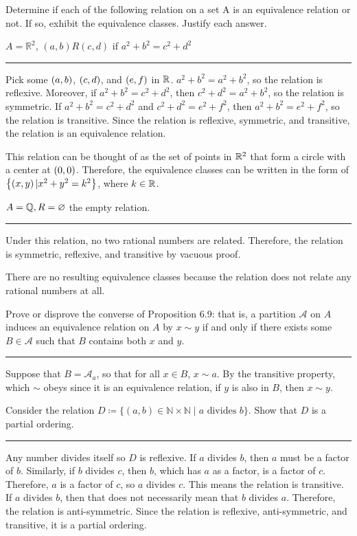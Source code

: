 \documentclass{article}
\begin{document}
\problem{}
Determine if each of the following relation on a set A is an equivalence relation or not.
If so, exhibit the equivalence classes.
Justify each answer.

\subproblema{}
$A=\mathbb{R}^2$, $(a,b) R(c,d)$ if $a^2+b^2=c^2+d^2$
\hrule

Pick some $\left (a, b \right)$, $\left (c, d \right)$, and $\left (e, f \right)$ in $\mathbb R$.
$a^2 + b^2 = a^2 + b^2$, so the relation is reflexive.
Moreover, if $a^2 + b^2 = c^2 + d^2$, then $c^2 + d^2 = a^2 + b^2$, so the relation is symmetric.
If $a^2 + b^2 = c^2 + d^2$ and $c^2 + d^2 = e^2 + f^2$, then $a^2 + b^2 = e^2 + f^2$, so the relation is transitive.
Since the relation is reflexive, symmetric, and transitive, the relation is an equivalence relation.

This relation can be thought of as the set of points in $\mathbb R^2$ that form a circle with a center at $\left (0, 0 \right)$.
Therefore, the equivalence classes can be written in the form of $\left \{  \left (x, y \right) | x^2 + y^2 = k^2 \right \}$, where $k \in \mathbb R$.

\subproblema{}

$A = \mathbb Q, R = \varnothing$ the empty relation.
\hrule

Under this relation, no two rational numbers are related.
Therefore, the relation is symmetric, reflexive, and transitive by vacuous proof.

There are no resulting equivalence classes because the relation does not relate any rational numbers at all.

\problem{}

Prove or disprove the converse of Proposition 6.9: that is, a partition $\mathcal{A}$ on $A$ induces an equivalence relation on $A$ by $x\sim y$ if and only if there exists some $B\in\mathcal{A}$ such that $B$ contains both $x$ and $y$.

\hrule
Suppose that $B = \mathcal{A}_a$, so that for all $x \in B$, $x \sim a$.
By the transitive property, which $\sim$ obeys since it is an equivalence relation, if $y$ is also in $B$, then $x \sim y$.


\problem{}
Consider the relation $D\coloneqq \{(a,b)\in \mathbb{N}\times \mathbb{N}\mid a\text{ divides }b\}$. Show that $D$ is a partial ordering.
\hrule

Any number divides itself so $D$ is reflexive.
If $a$ divides $b$, then $a$ must be a factor of $b$.
Similarly, if $b$ divides $c$, then $b$, which has $a$ as a factor, is a factor of $c$.
Therefore, $a$ is a factor of $c$, so $a$ divides $c$.
This means the relation is transitive.
If $a$ divides $b$, then that does not necessarily mean that $b$ divides $a$.
Therefore, the relation is anti-symmetric.
Since the relation is reflexive, anti-symmetric, and transitive, it is a partial ordering.
\end{document}
